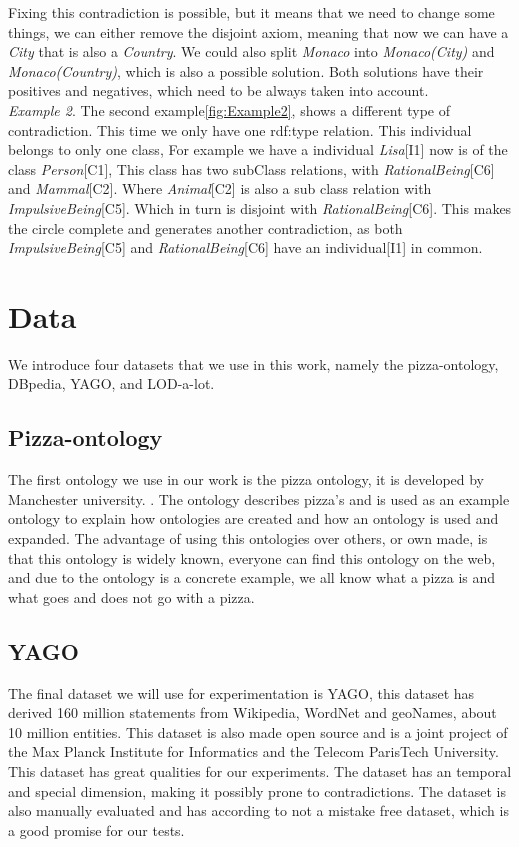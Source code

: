 \documentclass[11pt,letterpaper ,oneside ]{book}
\begin{document}
Fixing this contradiction is possible, but it means that we need to change some things, we can either remove the disjoint axiom, meaning that now we can have a \textit{City} that is also a \textit{Country}. We could also split \textit{Monaco} into \textit{Monaco(City)} and \textit{Monaco(Country)}, which is also a possible solution. Both solutions have their positives and negatives, which need to be always taken into account.\\

\textit{Example 2}. The second example\ref{fig:Example2}, shows a different type of contradiction. This time we only have one rdf:type relation. This individual belongs to only one class, For example we have a individual \textit{Lisa}[I1] now is of the class \textit{Person}[C1], This class has two subClass relations, with \textit{RationalBeing}[C6] and \textit{Mammal}[C2]. Where \textit{Animal}[C2] is also a sub class relation with \textit{ImpulsiveBeing}[C5]. Which in turn is disjoint with \textit{RationalBeing}[C6]. This makes the circle complete and generates another contradiction, as both \textit{ImpulsiveBeing}[C5] and \textit{RationalBeing}[C6] have an individual[I1] in common. \\

\section{Data}
We introduce four datasets that we use in this work, namely the pizza-ontology, DBpedia, YAGO, and LOD-a-lot.

\subsection{Pizza-ontology}
The first ontology we use in our work is the pizza ontology, it is developed by Manchester university. \cite{pizza}. The ontology describes pizza's and is used as an example ontology to explain how ontologies are created and how an ontology is used and expanded. The advantage of using this ontologies over others, or own made, is that this ontology is widely known, everyone can find this ontology on the web, and due to the ontology is a concrete example, we all know what a pizza is and what goes and does not go with a pizza. \\

\subsection{YAGO}
The final dataset we will use for experimentation is YAGO\cite{YAGO2:2013}, this dataset has derived 160 million statements from Wikipedia, WordNet and geoNames, about 10 million entities. This dataset is also made open source and is a joint project of the Max Planck Institute for Informatics and the Telecom ParisTech University. This dataset has great qualities for our experiments. The dataset has an temporal and special dimension, making it possibly prone to contradictions. The dataset is also manually evaluated and has according to \cite{YAGO2:2013} not a mistake free dataset, which is a good promise for our tests.
\end{document}
